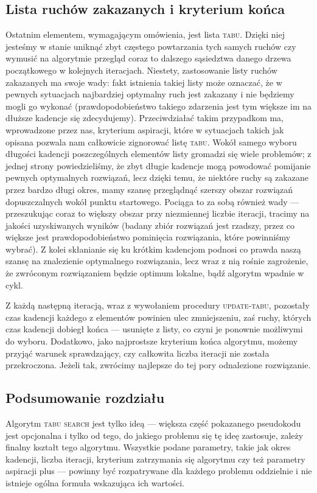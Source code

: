 \subsection{Lista ruchów zakazanych i kryterium końca}

Ostatnim elementem, wymagającym omówienia, jest lista \textsc{tabu}. Dzięki niej jesteśmy w stanie uniknąć zbyt częstego powtarzania tych samych ruchów czy wymusić na algorytmie przegląd coraz to dalszego sąsiedztwa danego drzewa początkowego w kolejnych iteracjach. Niestety, zastosowanie listy ruchów zakazanych ma swoje wady: fakt istnienia takiej listy może oznaczać, że w pewnych sytuacjach najbardziej optymalny ruch jest zakazany i nie będziemy mogli go wykonać (prawdopodobieństwo takiego zdarzenia jest tym większe im na dłuższe kadencje się zdecydujemy). Przeciwdziałać takim przypadkom ma, wprowadzone przez nas, kryterium aspiracji, które w sytuacjach takich jak opisana pozwala nam całkowicie zignorować listę \textsc{tabu}. Wokół samego wyboru długości kadencji poszczególnych elementów listy gromadzi się wiele problemów; z jednej strony powiedzieliśmy, że zbyt długie kadencje mogą powodować pomijanie pewnych optymalnych rozwiązań, lecz dzięki temu, że niektóre ruchy są zakazane przez bardzo długi okres, mamy szansę przeglądnąć szerszy obszar rozwiązań dopuszczalnych wokół punktu startowego. Pociąga to za sobą również wady --- przeszukując coraz to większy obszar przy niezmiennej liczbie iteracji, tracimy na jakości uzyskiwanych wyników (badany zbiór rozwiązań jest rzadszy, przez co większe jest prawdopodobieństwo pominięcia rozwiązania, które powinniśmy wybrać). Z kolei skłanianie się ku krótkim kadencjom podnosi co prawda naszą szansę na znalezienie optymalnego rozwiązania, lecz wraz z nią rośnie zagrożenie, że zwróconym rozwiązaniem będzie optimum lokalne, bądź algorytm wpadnie w cykl.

Z każdą następną iteracją, wraz z wywołaniem procedury \textsc{update-tabu}, pozostały czas kadencji każdego z elementów powinien ulec zmniejszeniu, zaś ruchy, których czas kadencji dobiegł końca --- usunięte z listy, co czyni je ponownie możliwymi do wyboru. Dodatkowo, jako najprostsze kryterium końca algorytmu, możemy przyjąć warunek sprawdzający, czy całkowita liczba iteracji nie została przekroczona. Jeżeli tak, zwrócimy najlepsze do tej pory odnalezione rozwiązanie.

\subsection{Podsumowanie rozdziału}

Algorytm \textsc{tabu search} jest tylko ideą --- większa część pokazanego pseudokodu jest opcjonalna i tylko od tego, do jakiego problemu się tę ideę zastosuje, zależy finalny kształt tego algorytmu. Wszystkie podane parametry, takie jak okres kadencji, liczba iteracji, kryterium zatrzymania się algorytmu czy też parametry aspiracji plus --- powinny być rozpatrywane dla każdego problemu oddzielnie i nie istnieje ogólna formuła wskazująca ich wartości.